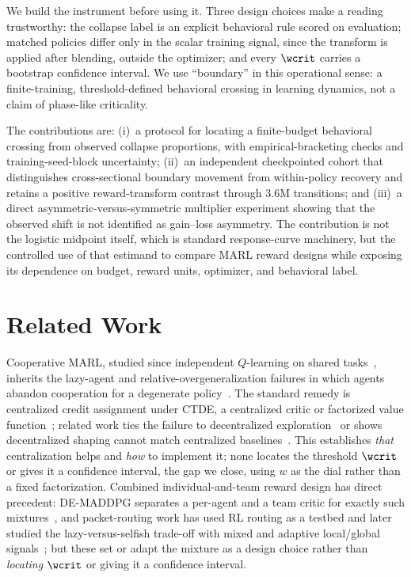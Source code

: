 We build the instrument before using it. Three design choices make a reading trustworthy: the collapse
label is an explicit behavioral rule scored on evaluation; matched policies differ only in the
scalar training signal, since the transform is applied after blending, outside the optimizer; and every
$\wcrit$ carries a bootstrap confidence interval. We use ``boundary'' in this operational sense: a
finite-training, threshold-defined behavioral crossing in learning dynamics, not a claim of phase-like
criticality.

The contributions are: (i)~a protocol for locating a finite-budget behavioral crossing from observed
collapse proportions, with empirical-bracketing checks and training-seed-block uncertainty;
(ii)~an independent checkpointed cohort that distinguishes cross-sectional boundary movement from
within-policy recovery and retains a positive reward-transform contrast through 3.6M transitions; and
(iii)~a direct asymmetric-versus-symmetric multiplier experiment showing that the observed shift is
not identified as gain--loss asymmetry. The contribution is not the logistic midpoint itself, which is
standard response-curve machinery, but the controlled use of that estimand to compare MARL reward
designs while exposing its dependence on budget, reward units, optimizer, and behavioral label.

\section{Related Work}
\label{sec:related}

Cooperative MARL, studied since independent $Q$-learning on shared
tasks~\citep{tan1993multi,busoniu2008comprehensive}, inherits the lazy-agent and
relative-overgeneralization failures in which agents abandon cooperation for a degenerate
policy~\citep{liu2023lazy,peng2023curo,tampuu2017multiagent}. The standard remedy is centralized
credit assignment under CTDE, a centralized critic or factorized value
function~\citep{lowe2017multi,yu2022surprising,sunehag2018vdn,rashid2018qmix,foerster2018counterfactual,son2019qtran};
related work ties the failure to
decentralized exploration~\citep{weng2026} or shows decentralized shaping cannot match centralized
baselines~\citep{dmarl2025}. This establishes \emph{that} centralization helps and \emph{how} to
implement it; none locates the threshold $\wcrit$ or gives it a confidence interval, the gap we
close, using $w$ as the dial rather than a fixed factorization. Combined individual-and-team reward
design has direct precedent: DE-MADDPG separates a per-agent and a team critic for exactly such
mixtures~\citep{demaddpg2020}, and packet-routing work has used RL routing as a testbed and later
studied the lazy-versus-selfish trade-off with mixed and adaptive local/global
signals~\citep{packetrouting,mao2020reward}; but these set or adapt
the mixture as a design choice rather than \emph{locating} $\wcrit$ or giving it a confidence
interval.


